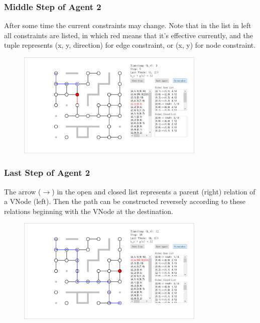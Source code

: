 \documentclass{beamer}
\begin{document}
\begin{frame}
\frametitle{Middle Step of Agent 2}
After some time the current constraints may change. Note that in the list in left all constraints are listed, in which red means that it's effective currently, and the tuple represents (x, y, direction) for edge constraint, or (x, y) for node constraint.
\begin{figure}
\centering
\includegraphics[width=0.8\textwidth]{a2s2.png}
\end{figure}
\end{frame}

\begin{frame}
\frametitle{Last Step of Agent 2}
The arrow ($\rightarrow$) in the open and closed list represents a parent (right) relation of a VNode (left). Then the path can be constructed reversely according to these relations beginning with the VNode at the destination.
\begin{figure}
\centering
\includegraphics[width=0.8\textwidth]{a2s3.png}
\end{figure}
\end{frame}
\end{document}
